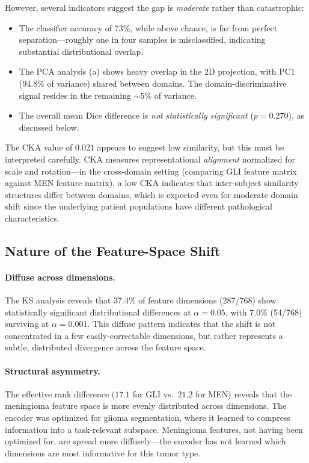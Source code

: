 \documentclass[11pt,a4paper]{article}
\theoremstyle{definition}
\begin{document}
However, several indicators suggest the gap is \emph{moderate} rather than catastrophic:
\begin{itemize}[nosep]
  \item The classifier accuracy of 73\%, while above chance, is far from perfect separation---roughly one in four samples is misclassified, indicating substantial distributional overlap.
  \item The PCA analysis (a) shows heavy overlap in the 2D projection, with PC1 (94.8\% of variance) shared between domains. The domain-discriminative signal resides in the remaining $\sim$5\% of variance.
  \item The overall mean Dice difference is \emph{not statistically significant} ($p = 0.270$), as discussed below.
\end{itemize}

The CKA value of $0.021$ appears to suggest low similarity, but this must be interpreted carefully. CKA measures representational \emph{alignment} normalized for scale and rotation---in the cross-domain setting (comparing GLI feature matrix against MEN feature matrix), a low CKA indicates that inter-subject similarity structures differ between domains, which is expected even for moderate domain shift since the underlying patient populations have different pathological characteristics.

\subsection{Nature of the Feature-Space Shift}

\paragraph{Diffuse across dimensions.} The KS analysis reveals that 37.4\% of feature dimensions (287/768) show statistically significant distributional differences at $\alpha = 0.05$, with 7.0\% (54/768) surviving at $\alpha = 0.001$. This diffuse pattern indicates that the shift is not concentrated in a few easily-correctable dimensions, but rather represents a subtle, distributed divergence across the feature space.

\paragraph{Structural asymmetry.} The effective rank difference ($17.1$ for GLI vs.\ $21.2$ for MEN) reveals that the meningioma feature space is more evenly distributed across dimensions. The encoder was optimized for glioma segmentation, where it learned to compress information into a task-relevant subspace. Meningioma features, not having been optimized for, are spread more diffusely---the encoder has not learned which dimensions are most informative for this tumor type.
\end{document}

